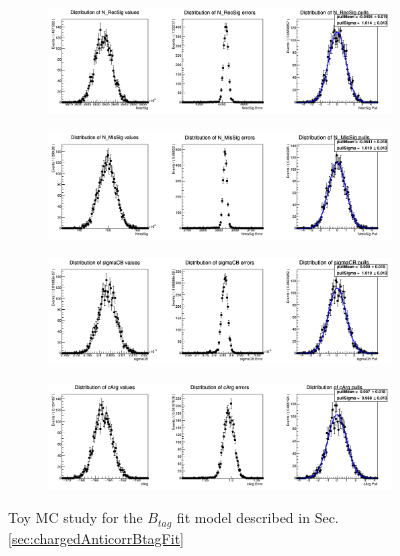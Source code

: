 \newpage

\begin{figure}[h!]
  \begin{subfigure}{15cm}
    \centering\includegraphics[width=14cm]{A3-Appendix/figs/NrecSigchargedBtag_mcstudy.png}
  \end{subfigure}
  \begin{subfigure}{15cm}
    \centering\includegraphics[width=14cm]{A3-Appendix/figs/NmisSigchargedBtag_mcstudy.png}
  \end{subfigure}

  \begin{subfigure}{15cm}
    \centering\includegraphics[width=14cm]{A3-Appendix/figs/sigmaCBchargedBtag_mcstudy.png}
  \end{subfigure}
  \begin{subfigure}{15cm}
    \centering\includegraphics[width=14cm]{A3-Appendix/figs/cArg_chargedBtag_mcstudy.png}
  \end{subfigure}
  \caption{Toy MC study for the $B_{tag}$ fit model described in Sec. \ref{sec:chargedAnticorrBtagFit}}
\end{figure}

